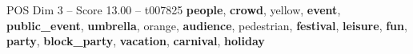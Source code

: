 \begin{textsample}{POS Dim 3 – Score 13.00 – t007825}  \label{ex:f3_pos_038}
\textbf{people}, \textbf{crowd}, yellow, \textbf{event}, \textbf{public\_event}, \textbf{umbrella}, orange, \textbf{audience}, pedestrian, \textbf{festival}, \textbf{leisure}, \textbf{fun}, \textbf{party}, \textbf{block\_party}, \textbf{vacation}, \textbf{carnival}, \textbf{holiday}

\end{textsample}
